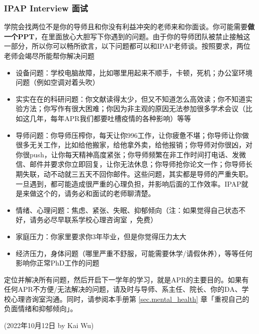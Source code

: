 \subsubsection{IPAP Interview 面试}
\label{sec.IPAP}
学院会找两位不是你的导师且和你没有利益冲突的老师来和你面谈。你可能需要\textbf{做一个PPT}，在里面放心大胆写下你遇到的问题。由于你的导师团队被禁止接触这一部分，所以你可以畅所欲言，以下问题都可以和IPAP老师谈。按照要求，两位老师会竭尽所能帮你解决问题
\begin{itemize}
    \item 设备问题：学校电脑故障，比如哪里用起来不顺手，卡顿，死机；办公室环境问题（例如空调对着头吹）
    \item 实实在在的科研问题：你文献读得太少，但又不知道怎么高效读；你不知道实验方法；你写作有很大困难；你因为非主观的原因无法参加很多学术会议（比如这几年，每年APR我们都要吐槽疫情的各种影响）等等
    \item 导师问题：你导师压榨你，每天让你996工作，让你疲惫不堪；你导师让你做很多无关工作，比如给他搬家，给他拿外卖，给他报销；你导师对你很凶，对你很push，让你每天精神高度紧张；你导师频繁在非工作时间打电话、发微信、邮件并要求你立即回复，让你无法休息；你导师抢你论文一作；你导师长期失联，动不动就三五天不回你邮件。这些问题，其实都是导师的严重失职。一旦遇到，都可能造成很严重的心理负担，并影响后面的工作效率。IPAP就是来做这个的，请务必和面试的老师聊清楚。
    \item 情绪、心理问题：焦虑、紧张、失眠、抑郁倾向（注：如果觉得自己状态不好，请务必尽早联系学校心理咨询室  ，免费）
    \item 家庭压力：你家里要求你3年毕业，但是你觉得压力太大
    \item 经济压力，身体问题（哪里严重不舒服，可能需要休学/请假休养），等等任何影响你正常PhD工作的问题
\end{itemize}

\vspace{5mm}
定位并解决所有问题，然后开启下一学年的学习，就是APR的主要目的。如果有任何APR不方便/无法解决的问题，请及时与导师、系主任、院长、你的DA、学校心理咨询室沟通。同时，请参阅本手册第 \ref{sec.mental_health} 章「重视自己的负面情绪和抑郁倾向」。


\begin{flushright}
(2022年10月12日 by Kai Wu)
\end{flushright}